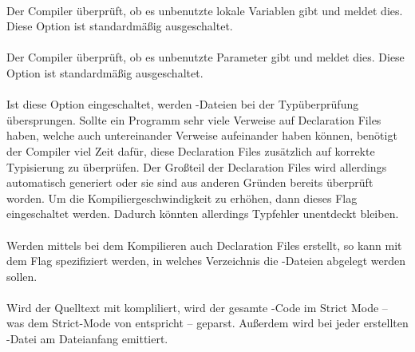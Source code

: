 \paragraph{}
Der Compiler überprüft, ob es unbenutzte lokale Variablen gibt und meldet dies. Diese Option ist standardmäßig ausgeschaltet.

\paragraph{}
Der Compiler überprüft, ob es unbenutzte Parameter gibt und meldet dies. Diese Option ist standardmäßig ausgeschaltet.

\paragraph{}
Ist diese Option eingeschaltet, werden -Da\-tei\-en bei der Typüberprüfung übersprungen. Sollte ein Programm sehr viele Verweise auf Declaration Files haben, welche auch untereinander Verweise aufeinander haben können, benötigt der Compiler viel Zeit dafür, diese Declaration Files zusätzlich auf korrekte Typisierung zu überprüfen. Der Großteil der Declaration Files wird allerdings automatisch generiert oder sie sind aus anderen Gründen bereits überprüft worden.
Um die Kompiliergeschwindigkeit zu erhöhen, dann dieses Flag eingeschaltet werden. Dadurch könnten allerdings Typfehler unentdeckt bleiben.

\paragraph{}
Werden mittels  bei dem Kompilieren auch Declaration Files erstellt, so kann mit dem Flag  spezifiziert werden, in welches Verzeichnis die -Da\-tei\-en abgelegt werden sollen.

\paragraph{}
Wird der Quelltext mit  kompliliert, wird der gesamte \ts-Code im Strict Mode -- was dem Strict-Mode von \js entspricht -- geparst. Außerdem wird bei jeder erstellten \js-Datei  am Dateianfang emittiert.

